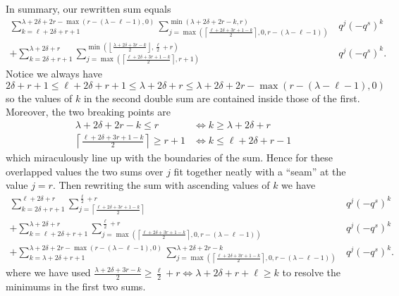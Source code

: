 In summary, our rewritten sum equals
\begin{align*}
  \sum_{k = \ell + 2\delta + r + 1}^{\lambda + 2 \delta + 2r - \max(r - (\lambda-\ell-1), 0)}
  \sum_{j=\max\left( \left\lceil \frac{\ell + 2\delta + 3r + 1 - k}{2} \right\rceil,
    0, r-(\lambda-\ell-1)\right)}^{\min\left( \lambda+2\delta+2r-k, r \right)}
    & q^j (-q^s)^k \\
  + \sum_{k = 2 \delta + r + 1}^{\lambda + 2 \delta + r}
  \sum_{j = \max\left( \left\lceil \frac{\ell + 2\delta + 3r + 1 - k}{2} \right\rceil, r + 1\right)}
  ^{\min\left( \left\lfloor \frac{\lambda+2\delta+3r-k}{2} \right\rfloor, \frac{\ell}{2} + r \right)}
    & q^j (-q^s)^k.
\end{align*}
Notice we always have
\[ 2\delta + r + 1 \le \ell + 2 \delta + r + 1 \le \lambda + 2 \delta + r
  \le \lambda + 2 \delta + 2r - \max\left( r - (\lambda - \ell - 1), 0 \right) \]
so the values of $k$ in the second double sum are contained inside those of the first.
Moreover, the two breaking points are
\begin{align*}
  \lambda + 2 \delta + 2 r - k \le r &\iff k \ge \lambda + 2 \delta + r \\
  \left\lceil \frac{\ell + 2 \delta + 3r + 1 - k}{2} \right\rceil \ge r+1
  &\iff k \le \ell + 2 \delta + r - 1
\end{align*}
which miraculously line up with the boundaries of the sum.
Hence for these overlapped values the two sums over $j$ fit together neatly
with a ``seam'' at the value $j = r$.
Then rewriting the sum with ascending values of $k$ we have
\begin{align*}
  \sum_{k = 2 \delta + r + 1}^{\ell + 2\delta + r}
    \sum_{j = \left\lceil \frac{\ell + 2\delta + 3r + 1 - k}{2} \right\rceil}^{\frac{\ell}{2} + r}
    & q^j (-q^s)^k \\
  + \sum_{k = \ell + 2 \delta + r + 1}^{\lambda + 2 \delta + r}
    \sum_{j=\max\left( \left\lceil \frac{\ell + 2\delta + 3r + 1 - k}{2} \right\rceil,
    0, r-(\lambda-\ell-1)\right)}^{\frac{\ell}{2} + r}
    & q^j (-q^s)^k \\
  + \sum_{k = \lambda + 2\delta + r + 1}^{\lambda + 2 \delta + 2r - \max(r - (\lambda-\ell-1), 0)}
    \sum_{j=\max\left( \left\lceil \frac{\ell + 2\delta + 3r + 1 - k}{2} \right\rceil,
    0, r-(\lambda-\ell-1)\right)}^{\lambda+2\delta+2r-k}
    & q^j (-q^s)^k.
\end{align*}
where we have used
$\frac{\lambda+2\delta+3r-k}{2} \ge \frac{\ell}{2} + r \iff \lambda+2\delta+r+\ell \ge k$
to resolve the minimums in the first two sums.


